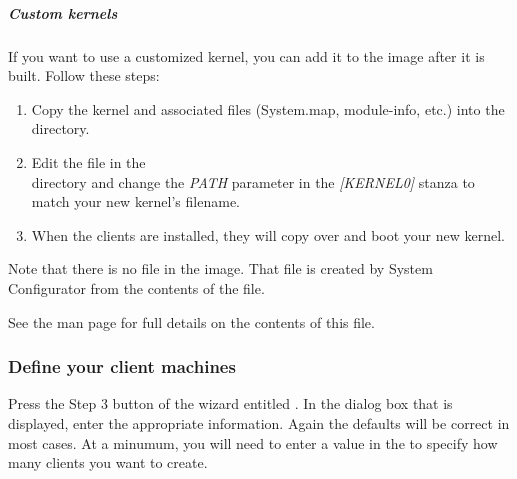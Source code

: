 \subparagraph{Custom kernels}
If you want to use a customized kernel, you can add it to the image
after it is built. Follow these steps:
\begin{enumerate}
\item Copy the kernel and associated files (System.map, module-info, etc.) into the \\
 directory.
\item Edit the  file in the \\
directory and change the \emph{PATH} parameter in the \emph{[KERNEL0]} stanza to 
match your new kernel's filename.
\item When the clients are installed, they will copy over and boot your new
kernel. 
\end{enumerate}
Note that there is no  file in the image. That file is created
by System Configurator from the contents of the  file.

See the  man page for full details on the
contents of this file.

\subsubsection{Define your client machines} 
\label{det:defclients}

Press the Step 3 button of the wizard entitled . In the dialog box that is displayed, enter the
appropriate information. Again the defaults will be correct in most
cases. At a minumum, you will need to enter a value in the 
to specify how many clients you want to create.

